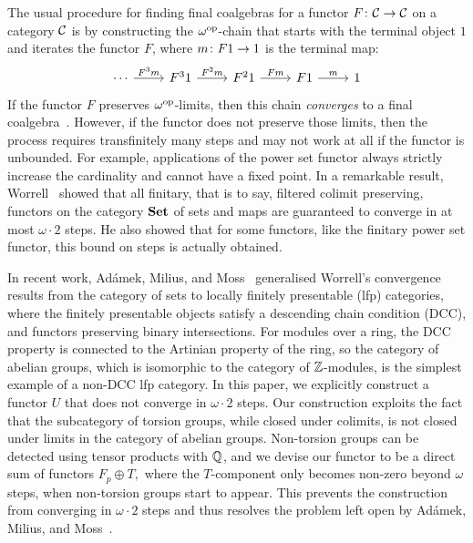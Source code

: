 \documentclass[runningheads]{llncs}
\begin{document}
The usual procedure for finding final coalgebras for a functor $F \colon \mathcal{C} \to \mathcal{C}$ on a category $\mathcal{C}$ is by constructing the $\omega^{\mathrm{op}}$-chain that starts with the terminal object $1$ and iterates the functor $F$, where $m \colon F1 \to 1$ is the terminal map:
 \begin{equation}
 \label{omegach}
\begin{tikzcd}
\cdots \rar{F^3m} & F^31 \rar{F^2m} & F^21 \rar{Fm} & F1  \rar{m} & 1
\end{tikzcd}
\end{equation}
If the functor $F$ preserves $\omega^{\mathrm{op}}$-limits, then this chain \emph{converges} to a final coalgebra~\cite{Adamek03}.
However, if the functor does not preserve those limits, then the process requires transfinitely many steps and may not work at all if the functor is unbounded.
For example, applications of the power set functor always strictly increase the cardinality and cannot have a fixed point.
In a remarkable result, Worrell~\cite{Worrell99,Worrell05} showed that all finitary, that is to say, filtered colimit preserving, functors on the category $\mathbf{Set}$ of sets and maps are guaranteed to converge in at most $\omega \cdot 2$ steps.
He also showed that for some functors, like the finitary power set functor, this bound on steps is actually obtained.

In recent work, Ad\'{a}mek, Milius, and Moss~\cite{AdamekEA25} generalised Worrell's convergence results from the category of sets to locally finitely presentable (lfp) categories, where the finitely presentable objects satisfy a descending chain condition (DCC), and functors preserving binary intersections.
For modules over a ring, the DCC property is connected to the Artinian property of the ring, so the category of abelian groups, which is isomorphic to the category of $\mathbb{Z}$-modules, is the simplest example of a non-DCC lfp category.
In this paper, we explicitly construct a functor $U$ that does not converge in $\omega \cdot 2$ steps.
Our construction exploits the fact that the subcategory of torsion groups, while closed under colimits, is not closed under limits in the category of abelian groups.
Non-torsion groups can be detected using tensor products with $\mathbb{Q}$, and we devise our functor to be a direct sum of functors $F_p\oplus T,$ where the $T$-component only becomes non-zero beyond $\omega$ steps, when non-torsion groups start to appear.
This prevents the construction from converging in $\omega \cdot 2$ steps and thus resolves the problem left open by Ad\'{a}mek, Milius, and Moss~\cite{AdamekEA25}.
\end{document}
